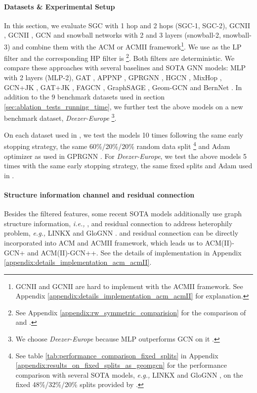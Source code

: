 \documentclass{article}
\newcommand\ie{\textit{i.e.,}}
\newcommand\eg{\textit{e.g.,}}
\newcommand{\0}{{\boldsymbol{0}}}
\newcommand{\6}{{\partial}}
\newcommand{\8}{{\infty}}
\newcommand{\4}{{\nabla}}
\begin{document}
\paragraph{Datasets \& Experimental Setup}
In this section, we evaluate SGC \cite{wu2019simplifying} with 1 hop and 2 hops (SGC-1, SGC-2), GCNII \cite{chen2020simple}, GCNII \cite{chen2020simple}, GCN \cite{kipf2016classification} and snowball networks \cite{luan2019break} with 2 and 3 layers (snowball-2, snowball-3) and combine them with the ACM or ACMII framework\footnote{GCNII and GCNII are hard to implement with the ACMII framework. See Appendix \ref{appendix:details_implementation_acm_acmII} for explanation.}. We use  as the LP filter and the corresponding HP filter is  \footnote{See Appendix \ref{appendix:rw_symmetric_comparision} for the comparison of  and .}. Both filters are deterministic. We compare these approaches with several baselines and SOTA GNN models: MLP with 2 layers (MLP-2), GAT \cite{velivckovic2017attention},  APPNP \cite{klicpera2018predict}, GPRGNN \cite{chien2021adaptive}, HGCN \cite{zhu2020beyond}, MixHop \cite{abu2019mixhop}, GCN+JK \cite{kipf2016classification, pmlr-v80-xu18c, lim2021new}, GAT+JK \cite{velivckovic2017attention, pmlr-v80-xu18c, lim2021new}, FAGCN \cite{bo2021beyond}, GraphSAGE \cite{hamilton2017inductive}, Geom-GCN \cite{pei2020geom} and BernNet \cite{he2021bernnet}. In addition to the 9 benchmark datasets used in section \ref{sec:ablation_tests_running_time}, we further test the above models on a new benchmark dataset, \textit{Deezer-Europe} \cite{feather}\footnote{We choose \textit{Deezer-Europe} because  MLP outperforms GCN on it \cite{lim2021new}.}.


On each dataset used in \cite{musae,pei2020geom}, we test the models 10 times following the same early stopping strategy, the same 60\%/20\%/20\% random data split \footnote{See table \ref{tab:performance_comparison_fixed_splits} in Appendix \ref{appendix:results_on_fixed_splits_as_geomgcn} for the performance comparison with several SOTA models, \eg{} LINKX \cite{lim2021large} and GloGNN \cite{li2022finding}, on the fixed 48\%/32\%/20\% splits provided by \cite{pei2020geom}.} and Adam \cite{kingma2014adam} optimizer as used in GPRGNN \cite{chien2021adaptive}.  For \textit{Deezer-Europe}, we test the above models 5 times with the same early stopping strategy, the same fixed splits and Adam used in \cite{lim2021new}. \vspace{-0.3cm}
\paragraph{Structure information channel and residual connection} Besides the filtered features, some recent SOTA models additionally use graph structure information, \ie{} , and residual connection to address heterophily problem, \eg{} LINKX \cite{lim2021large} and GloGNN \cite{li2022finding}.  and residual connection can be directly incorporated into ACM and ACMII framework, which leads us to ACM(II)-GCN+ and ACM(II)-GCN++. See the details of implementation in Appendix \ref{appendix:details_implementation_acm_acmII}.
\end{document}
